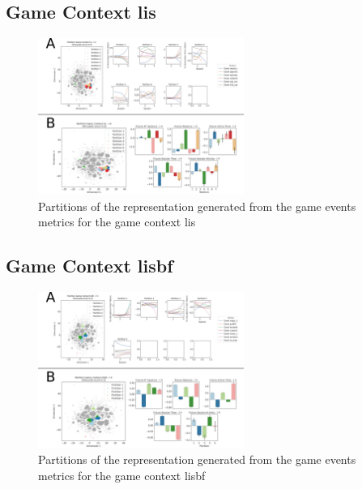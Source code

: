 \subsection{Game Context lis}
\label{even_clust_lis}

\begin{figure}[!htb]
\includegraphics[width=0.6\textwidth]{images/appendix_D/clust_even_lis.png}
\centering
\caption[\textbf{Partitions of the representation generated from the game events metrics for the game context lis}]{Partitions of the representation generated from the game events metrics for the game context lis}
\end{figure}
\FloatBarrier

\subsection{Game Context lisbf}
\label{even_clust_lisbf}

\begin{figure}[!htb]
\includegraphics[width=0.6\textwidth]{images/appendix_D/clust_even_lisbf.png}
\centering
\caption[\textbf{Partitions of the representation generated from the game events metrics for the game context lisbf}]{Partitions of the representation generated from the game events metrics for the game context lisbf}
\end{figure}
\FloatBarrier
